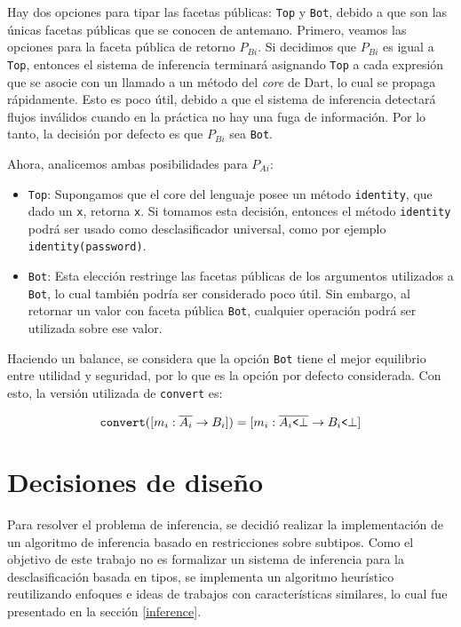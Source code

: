Hay dos opciones para tipar las facetas públicas: \texttt{Top} y \texttt{Bot}, debido a que son las únicas facetas públicas que se conocen de antemano. Primero, veamos las opciones para la faceta pública de retorno $P_{Bi}$. Si decidimos que $P_{Bi}$ es igual a \texttt{Top}, entonces el sistema de inferencia terminará asignando \texttt{Top} a cada expresión que se asocie con un llamado a un método del \emph{core} de Dart, lo cual se propaga rápidamente. Esto es poco útil, debido a que el sistema de inferencia detectará flujos inválidos cuando en la práctica no hay una fuga de información. Por lo tanto, la decisión por defecto es que $P_{Bi}$ sea \texttt{Bot}.

Ahora, analicemos ambas posibilidades para $P_{Ai}$:

\begin{itemize}
  \item \texttt{Top}: Supongamos que el core del lenguaje posee un método \texttt{identity}, que dado un \texttt{x}, retorna \texttt{x}. Si tomamos esta decisión, entonces el método \texttt{identity} podrá ser usado como desclasificador universal, como por ejemplo \texttt{identity(password)}.
  \item \texttt{Bot}: Esta elección restringe las facetas públicas de los argumentos utilizados a \texttt{Bot}, lo cual también podría ser considerado poco útil. Sin embargo, al retornar un valor con faceta pública \texttt{Bot}, cualquier operación podrá ser utilizada sobre ese valor.
\end{itemize}

Haciendo un balance, se considera que la opción \texttt{Bot} tiene el mejor equilibrio entre utilidad y seguridad, por lo que es la opción por defecto considerada. Con esto, la versión utilizada de \texttt{convert} es:

\[
\mathtt{convert}([m_i: \overline{A_i} \rightarrow B_i]) = [m_i: \overline{A_i\text{\texttt{<}}\bot} \rightarrow B_i\text{\texttt{<}}\bot]
\]


\section{Decisiones de diseño} \label{diseno}
Para resolver el problema de inferencia, se decidió realizar la implementación de un algoritmo de inferencia basado en restricciones sobre subtipos. Como el objetivo de este trabajo no es formalizar un sistema de inferencia para la desclasificación basada en tipos, se implementa un algoritmo heurístico reutilizando enfoques e ideas de trabajos con características similares, lo cual fue presentado en la sección \ref{inference}.

